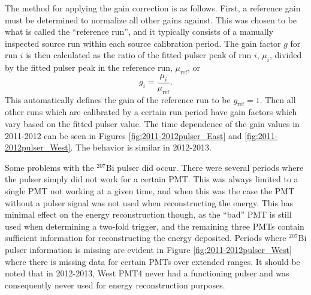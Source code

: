 The method for applying the gain correction is as follows. First, a reference gain must be determined
to normalize all other gains against. This was chosen to be what is called the ``reference run'', and it
typically consists of a manually inspected source run within each source calibration period. The gain factor $g$
for run $i$ 
is then calculated as the ratio of the fitted pulser peak of run $i$, $\mu_i$, divided by the fitted pulser peak in the reference
run, $\mu_{\mathrm{ref}}$, or
%
\begin{equation}
  g_i = \frac{\mu_i}{\mu_{\mathrm{ref}}}.
\end{equation}
%
This automatically defines the gain of the reference run to be $g_{\mathrm{ref}}=1$. Then all other runs which are
calibrated by a certain run period have gain factors which vary based on the fitted pulser value. The time
dependence of the gain values in 2011-2012 can be seen in Figures \ref{fig:2011-2012pulser_East}
and \ref{fig:2011-2012pulser_West}. The behavior is similar in 2012-2013.

Some problems with the $^{207}\mathrm{Bi}$ pulser did occur. There were several periods where the pulser
simply did not work for a certain PMT. This was always limited to a single PMT not working at a given time, and when this
was the case the PMT without a pulser signal was not used when reconstructing the energy. This has
minimal effect on the energy reconstruction though, as the ``bad'' PMT is still used when determining
a two-fold trigger, and the remaining three PMTs contain sufficient information for reconstructing the
energy deposited. Periods where $^{207}\mathrm{Bi}$ pulser information is missing are evident in
Figure \ref{fig:2011-2012pulser_West} where there is missing data for certain PMTs over extended ranges.
It should be noted that in 2012-2013, West PMT4 never had a functioning pulser and was consequently never used for
energy reconstruction purposes.

